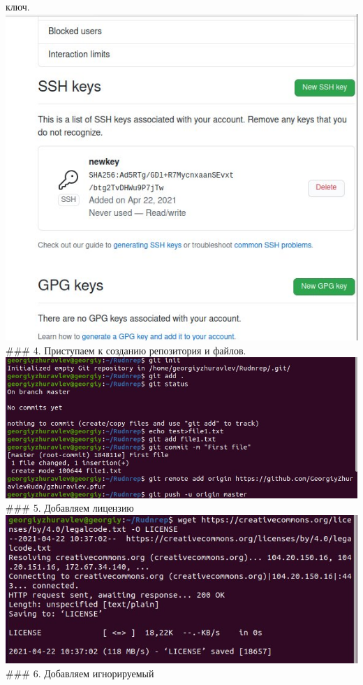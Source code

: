 ключ. \includegraphics{scrsht/3.jpg} \#\#\# 4. Приступаем к созданию
репозитория и файлов. \includegraphics{scrsht/4.jpg} \#\#\# 5. Добавляем
лицензию \includegraphics{scrsht/5.jpg} \#\#\# 6. Добавляем игнорируемый
